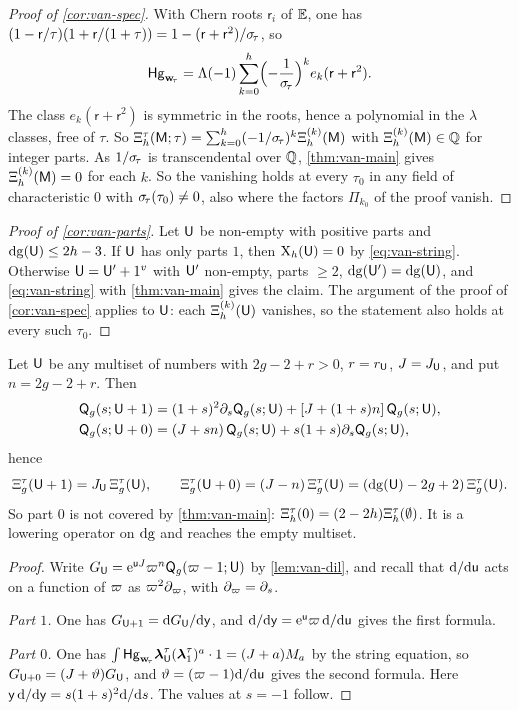 \begin{proof}[Proof of \cref{cor:van-spec}]
With Chern roots $\mathsf{r}_i$ of $\mathbb{E}$, one has $(1-\mathsf{r}/\tau)(1+\mathsf{r}/(1+\tau))=1-(\mathsf{r}+\mathsf{r}^2)/\sigma_{\!\tau}$, so
\[
\mathsf{Hg}_{\mathbf{w}_{\!\tau}}=\Lambda(-1)\sum_{k=0}^h\Bigl(-\frac{1}{\sigma_{\!\tau}}\Bigr)^ke_k(\mathsf{r}+\mathsf{r}^2).
\]
The class $e_k(\mathsf{r}+\mathsf{r}^2)$ is symmetric in the roots, hence a polynomial in the $\lambda$ classes, free of $\tau$. So $\Xi^{\tau}_h(\mathsf{M};\tau)=\sum_{k=0}^h(-1/\sigma_{\!\tau})^k\Xi^{(k)}_h(\mathsf{M})$ with $\Xi^{(k)}_h(\mathsf{M})\in\mathbb{Q}$ for integer parts. As $1/\sigma_{\!\tau}$ is transcendental over $\mathbb{Q}$, \cref{thm:van-main} gives $\Xi^{(k)}_h(\mathsf{M})=0$ for each $k$. So the vanishing holds at every $\tau_0$ in any field of characteristic $0$ with $\sigma_{\!\tau}(\tau_0)\neq 0$, also where the factors $\Pi_{k_0}$ of the proof vanish.
\end{proof}

\begin{proof}[Proof of \cref{cor:van-parts}]
Let $\mathsf{U}$ be non-empty with positive parts and $\mathrm{dg}(\mathsf{U})\leq 2h-3$. If $\mathsf{U}$ has only parts $1$, then $\mathrm{X}_h(\mathsf{U})=0$ by \eqref{eq:van-string}. Otherwise $\mathsf{U}=\mathsf{U}'+1^v$ with $\mathsf{U}'$ non-empty, parts $\geq 2$, $\mathrm{dg}(\mathsf{U}')=\mathrm{dg}(\mathsf{U})$, and \eqref{eq:van-string} with \cref{thm:van-main} gives the claim. The argument of the proof of \cref{cor:van-spec} applies to $\mathsf{U}$: each $\Xi^{(k)}_h(\mathsf{U})$ vanishes, so the statement also holds at every such $\tau_0$.
\end{proof}

\begin{lem}\label{lem:van-part01}
Let $\mathsf{U}$ be any multiset of numbers with $2g-2+r>0$, $r=r_{\mathsf{U}}$, $J=J_{\mathsf{U}}$, and put $n=2g-2+r$. Then
\begin{align*}
\mathsf{Q}_g(s;\mathsf{U}+1)&=(1+s)^2\partial_s\mathsf{Q}_g(s;\mathsf{U})+[J+(1+s)n]\,\mathsf{Q}_g(s;\mathsf{U}),\\
\mathsf{Q}_g(s;\mathsf{U}+0)&=(J+sn)\,\mathsf{Q}_g(s;\mathsf{U})+s(1+s)\partial_s\mathsf{Q}_g(s;\mathsf{U}),
\end{align*}
hence
\[
\Xi^{\tau}_g(\mathsf{U}+1)=J_{\mathsf{U}}\,\Xi^{\tau}_g(\mathsf{U}),\qquad\Xi^{\tau}_g(\mathsf{U}+0)=(J-n)\,\Xi^{\tau}_g(\mathsf{U})=(\mathrm{dg}(\mathsf{U})-2g+2)\,\Xi^{\tau}_g(\mathsf{U}).
\]
So part $0$ is not covered by \cref{thm:van-main}: $\Xi^{\tau}_h(0)=(2-2h)\Xi^{\tau}_h(\emptyset)$. It is a lowering operator on $\mathrm{dg}$ and reaches the empty multiset.
\end{lem}

\begin{proof}
Write $G_{\mathsf{U}}=\mathrm{e}^{\mathsf{u} J}\varpi^n\mathsf{Q}_g(\varpi-1;\mathsf{U})$ by \cref{lem:van-dil}, and recall that $\mathrm{d}/\mathrm{d}\mathsf{u}$ acts on a function of $\varpi$ as $\varpi^2\partial_{\varpi}$, with $\partial_{\varpi}=\partial_s$.

\emph{Part $1$.} One has $G_{\mathsf{U}+1}=\mathrm{d} G_{\mathsf{U}}/\mathrm{d}\mathsf{y}$, and $\mathrm{d}/\mathrm{d}\mathsf{y}=\mathrm{e}^{\mathsf{u}}\varpi\,\mathrm{d}/\mathrm{d}\mathsf{u}$ gives the first formula.

\emph{Part $0$.} One has $\int\mathsf{Hg}_{\mathbf{w}_{\!\tau}}\boldsymbol{\lambda}^{\tau}_{\mathsf{U}}(\boldsymbol{\lambda}^{\tau}_1)^a\cdot 1=(J+a)M_a$ by the string equation, so $G_{\mathsf{U}+0}=(J+\vartheta)G_{\mathsf{U}}$, and $\vartheta=(\varpi-1)\mathrm{d}/\mathrm{d}\mathsf{u}$ gives the second formula. Here $\mathsf{y}\,\mathrm{d}/\mathrm{d}\mathsf{y}=s(1+s)^2\mathrm{d}/\mathrm{d} s$. The values at $s=-1$ follow.
\end{proof}

